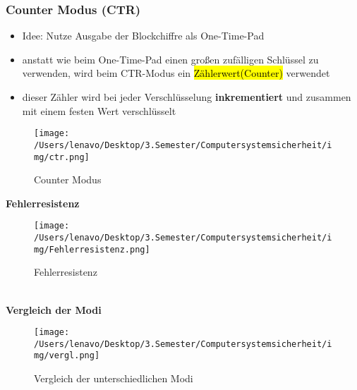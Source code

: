 \documentclass[a4paper, 10pt]{article}
\begin{document}
\subsubsection{Counter Modus (CTR)}
\begin{itemize}
    \item Idee: Nutze Ausgabe der Blockchiffre als One-Time-Pad
    \item anstatt wie beim One-Time-Pad einen großen zufälligen Schlüssel zu verwenden, wird beim CTR-Modus ein \hl{Zählerwert(Counter)} verwendet
    \item dieser Zähler wird bei jeder Verschlüsselung \textbf{inkrementiert} und zusammen mit einem festen Wert verschlüsselt
\end{itemize}
\begin{figure}[h]
    \centering
    \texttt{[image: /Users/lenavo/Desktop/3.Semester/Computersystemsicherheit/img/ctr.png]}
    \caption{Counter Modus}
    \label{fig:enter-label}
\end{figure}
\textbf{Fehlerresistenz}
\begin{figure}[h]
    \centering
    \texttt{[image: /Users/lenavo/Desktop/3.Semester/Computersystemsicherheit/img/Fehlerresistenz.png]}
    \caption{Fehlerresistenz}
    \label{fig:enter-label}
\end{figure}\\[2mm]
\textbf{Vergleich der Modi}
\begin{figure}[h]
    \centering
    \texttt{[image: /Users/lenavo/Desktop/3.Semester/Computersystemsicherheit/img/vergl.png]}
    \caption{Vergleich der unterschiedlichen Modi}
    \label{fig:enter-label}
\end{figure}
\end{document}
